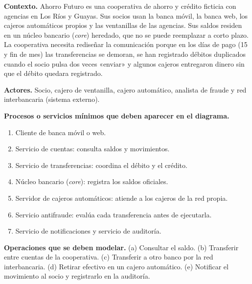 \documentclass[10pt]{article}
\begin{document}
\textbf{Contexto.} Ahorro Futuro es una cooperativa de ahorro y crédito ficticia con agencias en Los Ríos y Guayas. Sus socios usan la banca móvil, la banca web, los cajeros automáticos propios y las ventanillas de las agencias. Sus saldos residen en un núcleo bancario (\emph{core}) heredado, que no se puede reemplazar a corto plazo. La cooperativa necesita rediseñar la comunicación porque en los días de pago (15 y fin de mes) las transferencias se demoran, se han registrado débitos duplicados cuando el socio pulsa dos veces «enviar» y algunos cajeros entregaron dinero sin que el débito quedara registrado.

\textbf{Actores.} Socio, cajero de ventanilla, cajero automático, analista de fraude y red interbancaria (sistema externo).

\textbf{Procesos o servicios mínimos que deben aparecer en el diagrama.}
\begin{enumerate}[leftmargin=1.6em]
	\item Cliente de banca móvil o web.
	\item Servicio de cuentas: consulta saldos y movimientos.
	\item Servicio de transferencias: coordina el débito y el crédito.
	\item Núcleo bancario (\emph{core}): registra los saldos oficiales.
	\item Servidor de cajeros automáticos: atiende a los cajeros de la red propia.
	\item Servicio antifraude: evalúa cada transferencia antes de ejecutarla.
	\item Servicio de notificaciones y servicio de auditoría.
\end{enumerate}

\textbf{Operaciones que se deben modelar.} (a) Consultar el saldo. (b) Transferir entre cuentas de la cooperativa. (c) Transferir a otro banco por la red interbancaria. (d) Retirar efectivo en un cajero automático. (e) Notificar el movimiento al socio y registrarlo en la auditoría.
\end{document}
